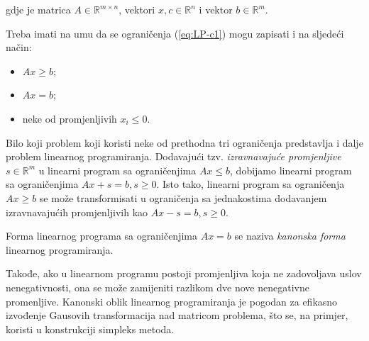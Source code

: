 \documentclass[a4paper, utf8, 11pt, colorlinks]{book}
\theoremstyle{definition}
\begin{document}
gdje je matrica $A \in \mathbb{R}^{m \times n}$, vektori  $x,c \in \mathbb{R}^n$ i vektor $b \in \mathbb{R}^{m}$.

Treba imati na umu da se ograničenja (\ref{eq:LP-c1}) mogu zapisati i na sljedeći način:
\begin{itemize}
    \item $Ax \geq b$;
    \item $Ax = b$;
    \item neke od promjenljivih $x_i\leqslant 0$.
\end{itemize}
Bilo koji problem koji koristi neke od prethodna tri ograničenja predstavlja i dalje problem linearnog programiranja. Dodavajući tzv. \emph{izravnavajuće promjenljive} $s \in \mathbb{R}^m$ u linearni program sa ograničenjima $Ax \leq b$, dobijamo linearni program sa ograničenjima $Ax + s = b, s \geq 0$. Isto tako, linearni program sa ograničenja $Ax \geq b$ se može transformisati u ograničenja sa jednakostima dodavanjem izravnavajućih promjenljivih kao $Ax - s = b, s\geq 0$.

 Forma linearnog programa sa ograničenjima $Ax = b$ se naziva \emph{kanonska forma} linearnog programiranja. 
 
 Takođe, ako u linearnom
programu postoji promjenljiva koja ne zadovoljava uslov nenegativnosti, ona se može zamijeniti razlikom dve nove nenegativne promenljive. Kanonski oblik linearnog programiranja je pogodan za efikasno izvođenje Gausovih transformacija  nad matricom problema, što se, na primjer, koristi u konstrukciji simpleks metoda.   %
\end{document}
